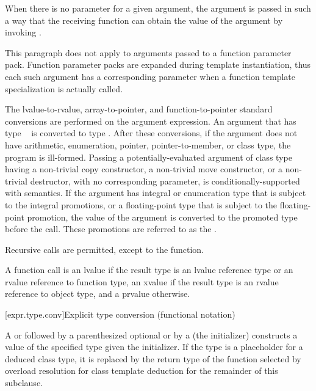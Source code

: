\pnum
{}%
When there is no parameter for a given argument, the argument is passed
in such a way that the receiving function can obtain the value of the
argument by invoking .
\begin{note} This paragraph does not apply to arguments passed to a function parameter pack.
Function parameter packs are expanded during template instantiation,
thus each such argument has a corresponding parameter when a function template
specialization is actually called. \end{note}
The
lvalue-to-rvalue, array-to-pointer,
and function-to-pointer standard conversions are
performed on the argument expression.
An argument that has type \cv{}~ is converted
to type .
After these conversions, if the
argument does not have arithmetic, enumeration, pointer, pointer-to-member,
or class type, the program is ill-formed. Passing a potentially-evaluated
argument of class type having a non-trivial
copy constructor, a non-trivial move constructor,
or a
non-trivial destructor, with no corresponding parameter, is conditionally-supported with
 semantics. If the argument has
integral or enumeration type that is subject to the integral
promotions, or a floating-point type that is subject to the
floating-point promotion, the value of the argument is converted to the
promoted type before the call. These promotions are referred to as
the .

\pnum
{}%
Recursive calls are permitted, except to the 
function.

\pnum
A function call is an lvalue
if the result type is an lvalue reference type or an rvalue reference to function type,
an xvalue if the result type is an rvalue reference to object type, and a prvalue
otherwise.

[expr.type.conv]{Explicit type conversion (functional notation)}

\pnum
{}%
%
%
%
%
A  or
 followed
by a parenthesized optional  or
by a 
(the initializer)
constructs a value of the specified type
given the initializer.
%
If the type is a placeholder
for a deduced class type,
it is replaced by the return type
of the function selected by overload resolution
for class template deduction
for the remainder of this subclause.

